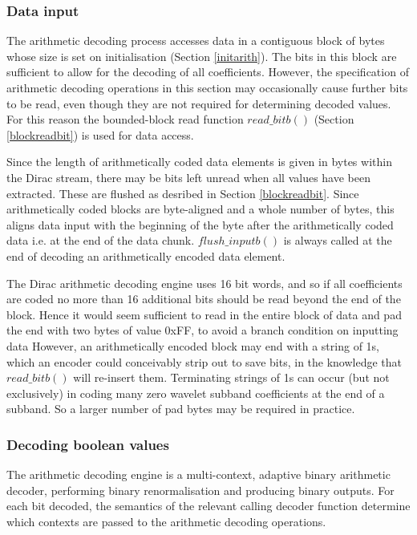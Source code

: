\subsubsection{Data input}
\label{inputarith}

The arithmetic decoding process accesses data in a contiguous block of bytes
whose size is set on initialisation (Section \ref{initarith}). The bits in this
block are sufficient to allow for the
decoding of all coefficients. However, the specification of arithmetic
decoding operations in this section may occasionally cause further bits to be read,
even though they are not required for determining decoded values. For this
reason the bounded-block read function $read\_bitb()$ (Section \ref{blockreadbit}) is 
used for data access.

Since the length of arithmetically coded data elements is given in bytes within the Dirac
stream, there may be bits left unread when all values have been extracted. These
are flushed as desribed in Section \ref{blockreadbit}. Since arithmetically coded blocks
are byte-aligned and a whole number of bytes, this aligns data input with the beginning of the byte 
after the arithmetically coded data i.e. at the end of the
data chunk. $flush\_inputb()$ is always called at the end of decoding an arithmetically encoded
data element.

\begin{informative}
The Dirac arithmetic decoding engine uses 16 bit words, and so if all coefficients are
coded no more than 16 additional bits should be read beyond the end of the block. Hence it 
would seem sufficient to read in the entire block of data and pad the end with two bytes of value 0xFF,
to avoid a branch condition on inputting data
However, an arithmetically encoded block may end with a string of 1s, which an encoder could
conceivably strip out to save bits, in the knowledge that $read\_bitb()$ will re-insert them. Terminating
strings of 1s can occur (but not exclusively) in coding many zero wavelet subband coefficients at the end
of a subband. So a larger number of pad bytes may be required in practice.
\end{informative}

\subsubsection{Decoding boolean values}
\label{arithreadbool}

The arithmetic decoding engine is a multi-context, adaptive binary
arithmetic decoder, performing binary renormalisation and producing
binary outputs. For each bit decoded, the semantics of the relevant
calling decoder function determine which contexts are passed to the
arithmetic decoding operations. 

